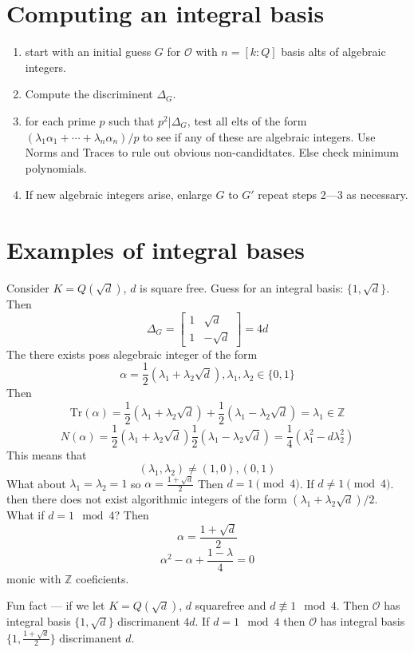 \documentclass{article}
\begin{document}
\section{Computing an integral basis}
\begin{enumerate}
\item start with an initial guess $G$ for $\mathcal{O}$ with $n = [k:Q]$ basis alts
of algebraic integers. 

\item Compute the discriminent $\Delta_G$.
\item for each prime $p$ such that $p^2 | \Delta_G$, test all elts of the form
$(\lambda_1 \alpha_1 + \cdots + \lambda_n \alpha_n) / p$ to see if any of these
are algebraic integers. Use Norms and Traces to rule out obvious
non-candidtates. Else check minimum polynomials.

\item If new algebraic integers arise, enlarge $G$ to $G'$ repeat steps 2---3 as
necessary. 
\end{enumerate}

\section{Examples of integral bases}
Consider $K = Q(\sqrt{d})$, $d$ is square free.
Guess for an integral basis: $\{1, \sqrt{d}\}$. Then 
\[ \Delta_G = \begin{bmatrix} 1 & \sqrt{d} \\ 1 & -\sqrt{d} \end{bmatrix} = 4d
\]
The there exists poss alegebraic integer of the form
\[ \alpha = \frac{1}{2}(\lambda_1 + \lambda_2 \sqrt{d}), \lambda_1,\lambda_2 \in
\{0,1\} \]
Then
\[ \text{Tr}(\alpha) = \frac{1}{2} (\lambda_1 + \lambda_2 \sqrt{d}) +
\frac{1}{2}(\lambda_1 - \lambda_2\sqrt{d}) = \lambda_1 \in \mathbb{Z} \]
\[ N(\alpha) = \frac{1}{2}(\lambda_1 +
\lambda_2\sqrt{d})\frac{1}{2}(\lambda_1-\lambda_2 \sqrt{d}) =
\frac{1}{4}(\lambda_1^2 - d\lambda_2^2) \]
This means that 
\[ (\lambda_1,\lambda_2) \neq (1,0), (0,1) \]
What about $\lambda_1 = \lambda_2 = 1$ so $\alpha = \frac{1 + \sqrt{d}}{2}$ Then
$d = 1 \pmod 4$. If $d \neq 1 \pmod 4$. then there does not exist algorithmic
integers of the form $(\lambda_1+\lambda_2\sqrt{d})/2$. What if $d = 1 \mod 4$?
Then
\[ \alpha = \frac{1+\sqrt{d}}{2} \]
\[ \alpha^2 - \alpha + \frac{1-\lambda}{4} = 0 \]
monic with $\mathbb{Z}$ coeficients. 

Fun fact --- if we let $K=Q(\sqrt{d})$, $d$ squarefree and $d \not\equiv 1 \mod
4$. Then $\mathcal{O}$ has integral basis $\{1,\sqrt{d}\}$ discrimanent $4d$. If
$d = 1\mod 4$ then $\mathcal{O}$ has integral basis $\{1,
\frac{1+\sqrt{d}}{2}\}$ discrimanent $d$. 
\end{document}
